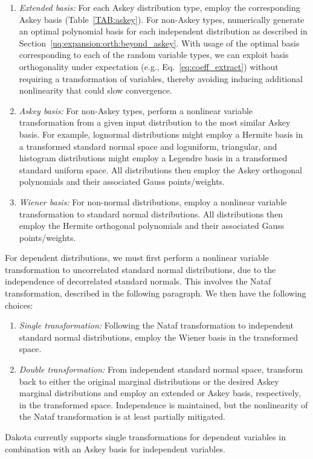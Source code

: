 \begin{enumerate}
\item {\it Extended basis:} For each Askey distribution type, employ
  the corresponding Askey basis (Table~\ref{TAB:askey}).  For
  non-Askey types, numerically generate an optimal polynomial basis
  for each independent distribution as described in
  Section~\ref{uq:expansion:orth:beyond_askey}.
  With usage of the optimal basis corresponding to each of the random
  variable types, we can exploit basis orthogonality under expectation
  (e.g., Eq.~\ref{eq:coeff_extract}) without requiring a transformation
  of variables, thereby avoiding inducing additional nonlinearity that
  could slow convergence.
\item {\it Askey basis:} For non-Askey types, perform a nonlinear
  variable transformation from a given input distribution to the most
  similar Askey basis.  For example, lognormal distributions might
  employ a Hermite basis in a transformed standard normal space and
  loguniform, triangular, and histogram distributions might employ a
  Legendre basis in a transformed standard uniform space.  All
  distributions then employ the Askey orthogonal polynomials and
  their associated Gauss points/weights.
\item {\it Wiener basis:} For non-normal distributions, employ a
  nonlinear variable transformation to standard normal distributions. All
  distributions then employ the Hermite orthogonal polynomials and
  their associated Gauss points/weights.
\end{enumerate}
For dependent distributions, we must first perform a nonlinear
variable transformation to uncorrelated standard normal distributions,
due to the independence of decorrelated standard normals.  This
involves the Nataf transformation, described in the following
paragraph.  We then have the following choices:
\begin{enumerate}
\item {\it Single transformation:} Following the Nataf transformation
  to independent standard normal distributions, employ the Wiener
  basis in the transformed space.
\item {\it Double transformation:} From independent standard normal
  space, transform back to either the original marginal distributions
  or the desired Askey marginal distributions and employ an extended
  or Askey basis, respectively, in the transformed space. Independence
  is maintained, but the nonlinearity of the Nataf transformation is
  at least partially mitigated.
\end{enumerate}
Dakota currently supports single transformations for dependent
variables in combination with an Askey basis for independent variables.

